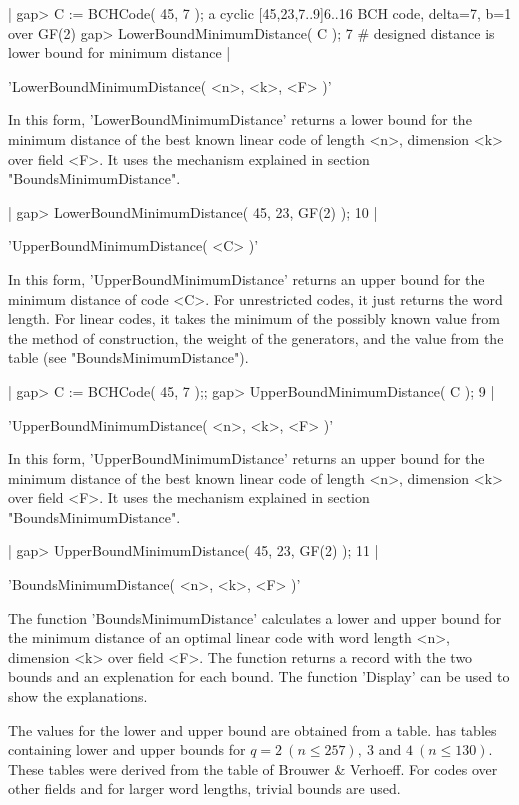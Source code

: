 |    gap> C := BCHCode( 45, 7 );
    a cyclic [45,23,7..9]6..16 BCH code, delta=7, b=1 over GF(2)
    gap> LowerBoundMinimumDistance( C );
    7     # designed distance is lower bound for minimum distance |

'LowerBoundMinimumDistance( <n>, <k>, <F> )'

In this  form, 'LowerBoundMinimumDistance' returns a  lower bound for the
minimum distance of  the best known linear  code of length <n>, dimension
<k>   over  field <F>.   It  uses the   mechanism   explained in  section
"BoundsMinimumDistance".

|    gap> LowerBoundMinimumDistance( 45, 23, GF(2) );
    10 |


'UpperBoundMinimumDistance( <C> )'

In this form, 'UpperBoundMinimumDistance'  returns an upper bound for the
minimum distance of code <C>. For unrestricted codes, it just returns the
word length. For linear codes, it takes the minimum of the possibly known
value from the method of construction,  the weight of the generators, and
the value from the table (see "BoundsMinimumDistance").

|    gap> C := BCHCode( 45, 7 );;
    gap> UpperBoundMinimumDistance( C );
    9 |

'UpperBoundMinimumDistance( <n>, <k>, <F> )'

In this form, 'UpperBoundMinimumDistance' returns  an upper bound for the
minimum distance of the  best known linear  code of length <n>, dimension
<k>  over  field   <F>.  It  uses the    mechanism explained  in  section
"BoundsMinimumDistance".

|    gap> UpperBoundMinimumDistance( 45, 23, GF(2) );
    11 |


'BoundsMinimumDistance( <n>, <k>, <F> )'

The function  'BoundsMinimumDistance' calculates a  lower and upper bound
for the minimum distance of an optimal  linear code with word length <n>,
dimension <k> over field <F>. The function  returns a record with the two
bounds and an explenation for  each bound. The  function 'Display' can be
used to show the explanations.

The  values   for the  lower   and  upper   bound  are  obtained from   a
table. {\GUAVA} has tables containing lower and upper bounds for $q=2\ (n
\leq 257),\ 3$ and $4\ (n \leq 130)$.  These tables were derived from the
table of Brouwer \& Verhoeff. For codes over  other fields and for larger
word lengths, trivial bounds are used.

